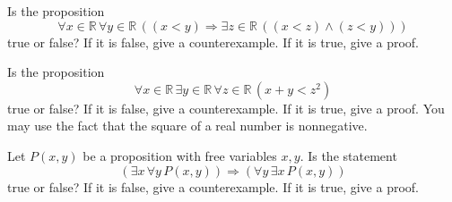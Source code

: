 \documentclass[12pt]{midterm}
\begin{document}
\begin{exam}
\begin{solution}\begin{solutiontext}
\end{solutiontext}\end{solution}

\begin{problem}[360]
  Is the proposition
  $$
  \forall x \in \mathbb{R}\, \forall y \in \mathbb{R}\, \left( \left(x < y\right) \Rightarrow \exists z \in \mathbb{R}\, \left( \left( x < z \right) \wedge (z < y) \right) \right)
  $$
  true or false?  If it is false, give a counterexample.  If it is true, give a proof.
\end{problem}

\begin{solution}\begin{solutiontext}
\end{solutiontext}\end{solution}

\begin{problem}[360]
  Is the proposition
  $$
  \forall x \in \mathbb{R}\, \exists y \in \mathbb{R}\, \forall z \in \mathbb{R}\, \left( x+y < z^2 \right)
  $$
  true or false?  If it is false, give a counterexample.  If it is
  true, give a proof.  You may use the fact that the square of a real
  number is nonnegative.
\end{problem}

\begin{solution}\begin{solutiontext}
\end{solutiontext}\end{solution}

\begin{problem}[360]
  Let $P(x,y)$ be a proposition with free variables $x,y$.  Is the statement
  $$
  \left( \exists x\,\forall y\, P(x,y) \right) \Rightarrow
  \left( \forall y\,\exists x\, P(x,y) \right)
  $$
  true or false? If it is false, give a counterexample.  If it is true, give a proof.
\end{problem}

\begin{solution}\begin{solutiontext}
\end{solutiontext}\end{solution}


\end{exam}
\end{document}
